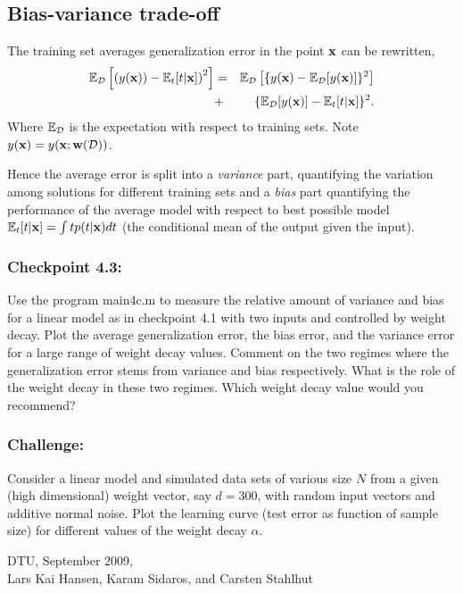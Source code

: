 \documentclass[times,12pt]{article}    %
\def\x{{\bf x}}
\def\w{{\bf w}}
\begin{document}
\subsection*{Bias-variance trade-off}
The training set averages generalization error in the point $\x$
can be rewritten,
\begin{eqnarray}
{\mathbb E}_{\cal D}\left[ \left(y(\x))-{\mathbb E}_{
t}[t|\x]\right)^2 \right]
& =& {\mathbb E}_{\cal D}\left[\{y(\x)- {\mathbb E}_{\cal D}[y(\x)]\}^2\right] \nonumber\\
&+& \{{\mathbb E}_{\cal D}[y(\x)] -{\mathbb E}_{t}[t|\x]\}^2.\nonumber
\end{eqnarray}
Where ${\mathbb E}_{\cal D}$ is the expectation with respect to training sets. Note $y(\x) = y(\x;\w({\cal D}))$.

Hence the average error is split into a {\it variance} part, quantifying
 the variation among
solutions for different training sets and a {\it bias} part
quantifying the performance of the average model with respect to
best possible model ${\mathbb E}_{t}[t|\x] = \int tp(t|\x)dt$ (the conditional
mean of the output given the input).


\subsubsection*{Checkpoint 4.3:}
Use the program {\sf main4c.m} to measure the relative amount of variance and bias
for a linear model as in checkpoint 4.1 with two inputs and controlled by weight
decay. Plot the average generalization error, the bias error, and the variance
error for a large range of weight decay values. Comment on the two
regimes where the generalization error stems from variance and bias respectively.
What is the role of the weight decay in these two regimes.
Which weight decay value would you recommend?

\subsubsection*{Challenge:}
 Consider a linear model and simulated data sets of various size $N$ from a given (high dimensional) weight vector, say $d=300$, with random input vectors and additive normal noise. Plot the learning curve (test error as function of sample size) for different values of the weight decay $\alpha$.



\vspace*{1cm}
\noindent DTU, September 2009,\\[2mm]
Lars Kai Hansen, Karam Sidaros, and Carsten Stahlhut
\end{document}
